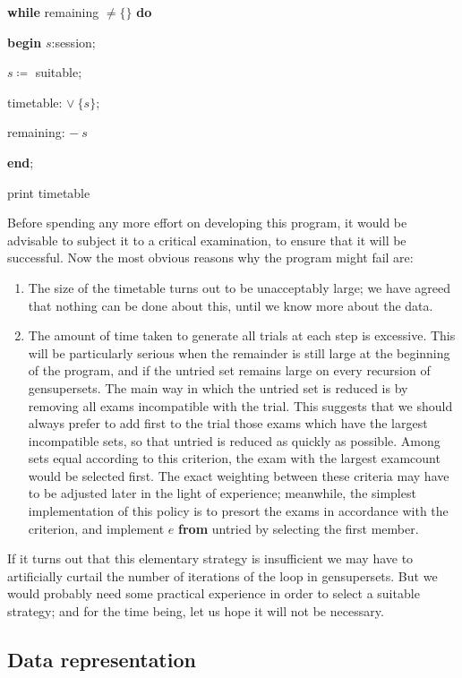\quad \textbf{while} remaining $\neq \{\}$ \textbf{do}

\quad \quad \quad \textbf{begin} $s$:session;

\quad \quad \quad \quad $s\coloneq$ suitable;

\quad \quad \quad \quad timetable: $\vee\ \{s\}$;

\quad \quad \quad \quad remaining: $-\ s$

\quad \quad \quad \textbf{end};

\quad print timetable

Before spending any more effort on developing this program, it would be advisable to subject it to a critical examination, to ensure that it will be successful. Now the most obvious reasons why the program might fail are:

\begin{enumerate}[wide, nosep, label=(\arabic*)]
	\item The size of the timetable turns out to be unacceptably large; we have agreed that nothing can be done about this, until we know more about the data.

	\item The amount of time taken to generate all trials at each step is excessive. This will be particularly serious when the remainder is still large at the beginning of the program, and if the untried set remains large on every recursion of gensupersets. The main way in which the untried set is reduced is by removing all exams incompatible with the trial. This suggests that we should always prefer to add first to the trial those exams which have the largest incompatible sets, so that untried is reduced as quickly as possible. Among sets equal according to this criterion, the exam with the largest examcount would be selected first. The exact weighting between these criteria may have to be adjusted later in the light of experience; meanwhile, the simplest implementation of this policy is to presort the exams in accordance with the criterion, and implement $e$ \textbf{from} untried by selecting the first member.
\end{enumerate}

If it turns out that this elementary strategy is insufficient we may have to artificially curtail the number of iterations of the loop in gensupersets. But we would probably need some practical experience in order to select a suitable strategy; and for the time being, let us hope it will not be necessary.

\subsection{Data representation}

